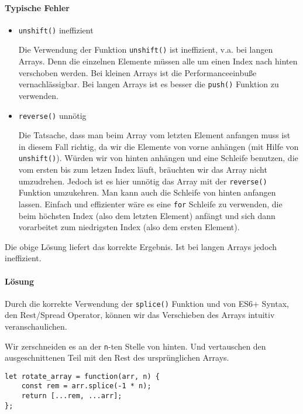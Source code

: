 \documentclass[babel]{book}
\begin{document}
\paragraph{Typische Fehler}
\begin{itemize} 
	\item \lstinline|unshift()| ineffizient
	
	Die Verwendung der Funktion \lstinline|unshift()| ist ineffizient, v.a. bei langen Arrays. Denn die einzelnen Elemente müssen alle um einen Index nach hinten verschoben werden. Bei kleinen Arrays ist die Performanceeinbuße vernachlässigbar. Bei langen Arrays ist es besser die \lstinline|push()| Funktion zu verwenden.
	
	\item \lstinline|reverse()| unnötig
	
	Die Tatsache, dass man beim Array vom letzten Element anfangen muss ist in diesem Fall richtig, da wir die Elemente von vorne anhängen (mit Hilfe von \lstinline|unshift()|). Würden wir von hinten anhängen und eine Schleife benutzen, die vom ersten bis zum letzen Index läuft, bräuchten wir das Array nicht umzudrehen. Jedoch ist es hier unnötig das Array mit der \lstinline|reverse()| Funktion umzukehren. Man kann auch die Schleife von hinten anfangen lassen. Einfach und effizienter wäre es eine \lstinline|for| Schleife zu verwenden, die beim höchsten Index (also dem letzten Element) anfängt und sich dann vorarbeitet zum niedrigsten Index (also dem ersten Element).
	
\end{itemize}

Die obige Lösung liefert das korrekte Ergebnis. Ist bei langen Arrays jedoch ineffizient.

\paragraph{Lösung} Durch die korrekte Verwendung der \lstinline|splice()| Funktion und von ES6+ Syntax, den Rest/Spread Operator, können wir das Verschieben des Arrays intuitiv veranschaulichen.

Wir zerschneiden es an der \lstinline|n|-ten Stelle von hinten. Und vertauschen den ausgeschnittenen Teil mit den Rest des ursprünglichen Arrays.

\begin{lstlisting}[caption=My Javascript Example]
let rotate_array = function(arr, n) {
	const rem = arr.splice(-1 * n);
	return [...rem, ...arr];
};
\end{lstlisting}
\end{document}
